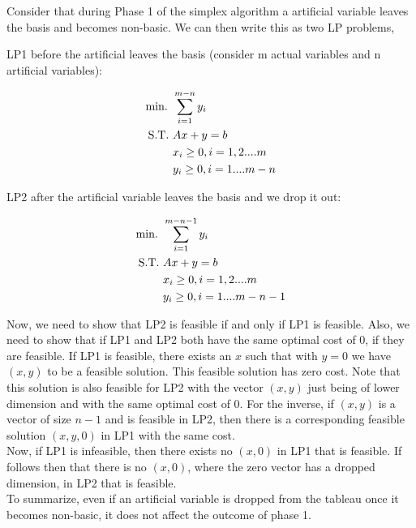 Consider that during Phase 1 of the simplex algorithm a artificial variable leaves the basis and becomes non-basic. We can then write this as two LP problems, 

LP1 before the artificial leaves the basis (consider m actual variables and n artificial variables):

\begin{align}
    \text{min. } &\sum_{i=1}^{m-n}y_i \notag\\
    \text{S.T. } &Ax + y = b \notag\\
    &x_i \ge 0, i = 1,2....m \notag\\
    &y_i \ge 0, i = 1....m-n \notag\\
\end{align}

LP2 after the artificial variable leaves the basis and we drop it out:

\begin{align}
    \text{min. } &\sum_{i=1}^{m-n-1}y_i \notag\\
    \text{S.T. } &Ax + y = b \notag\\
    &x_i \ge 0, i = 1,2....m \notag\\
    &y_i \ge 0, i = 1....m-n-1 \notag\\
\end{align}

Now, we need to show that LP2 is feasible if and only if LP1 is feasible. Also, we need to show that if LP1 and LP2 both have the same optimal cost of 0, if they are feasible. 
If LP1 is feasible, there exists an $x$ such that with $y=0$ we have $(x,y)$ to be a feasible solution. This feasible solution has zero cost. Note that this solution is also feasible for LP2 with the vector $(x,y)$ just being of lower dimension and with the same optimal cost of 0. For the inverse, if $(x,y)$ is a vector of size $n-1$ and is feasible in LP2, then there is a corresponding feasible solution $(x,y,0)$ in LP1 with the same cost. \\

Now, if LP1 is infeasible, then there exists no $(x,0)$ in LP1 that is feasible. If follows then that there is no $(x,0)$, where the zero vector has a dropped dimension, in LP2 that is feasible. \\

To summarize, even if an artificial variable is dropped from the tableau once it becomes non-basic, it does not affect the outcome of phase 1. 
